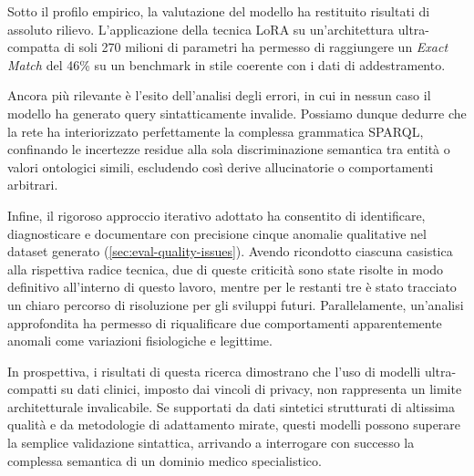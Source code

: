 \documentclass[12pt,a4paper,openright,twoside]{book}
\begin{document}
Sotto il profilo empirico, la valutazione del modello ha restituito risultati di
assoluto rilievo. L'applicazione della tecnica LoRA su un'architettura
ultra-compatta di soli 270 milioni di parametri ha permesso di raggiungere un
\textit{Exact Match} del 46\% su un benchmark in stile coerente con i dati di
addestramento.

Ancora più rilevante è l'esito dell'analisi degli errori, in cui in nessun caso
il modello ha generato query sintatticamente invalide. Possiamo dunque dedurre
che la rete ha interiorizzato perfettamente la complessa grammatica SPARQL,
confinando le incertezze residue alla sola discriminazione semantica tra entità
o valori ontologici simili, escludendo così derive allucinatorie o comportamenti
arbitrari.

Infine, il rigoroso approccio iterativo adottato ha consentito di identificare,
diagnosticare e documentare con precisione cinque anomalie qualitative nel
dataset generato (\cref{sec:eval-quality-issues}). Avendo ricondotto ciascuna
casistica alla rispettiva radice tecnica, due di queste criticità sono state
risolte in modo definitivo all'interno di questo lavoro, mentre per le restanti
tre è stato tracciato un chiaro percorso di risoluzione per gli sviluppi futuri.
Parallelamente, un'analisi approfondita ha permesso di riqualificare due
comportamenti apparentemente anomali come variazioni fisiologiche e legittime.

In prospettiva, i risultati di questa ricerca dimostrano che l'uso di modelli
ultra-compatti su dati clinici, imposto dai vincoli di privacy, non
rappresenta un limite architetturale invalicabile. Se supportati da dati
sintetici strutturati di altissima qualità e da metodologie di adattamento
mirate, questi modelli possono superare la semplice validazione sintattica,
arrivando a interrogare con successo la complessa semantica di un dominio medico
specialistico.


\backmatter




\end{document}
